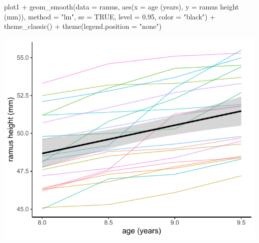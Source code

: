 \documentclass[
  9pt,
  ignorenonframetext,
]{beamer}
\newenvironment{Shaded}{\begin{snugshade}}{\end{snugshade}}
\newcommand{\AttributeTok}[1]{\textcolor[rgb]{0.77,0.63,0.00}{#1}}
\newcommand{\ConstantTok}[1]{\textcolor[rgb]{0.00,0.00,0.00}{#1}}
\newcommand{\FloatTok}[1]{\textcolor[rgb]{0.00,0.00,0.81}{#1}}
\newcommand{\FunctionTok}[1]{\textcolor[rgb]{0.00,0.00,0.00}{#1}}
\newcommand{\NormalTok}[1]{#1}
\newcommand{\SpecialCharTok}[1]{\textcolor[rgb]{0.00,0.00,0.00}{#1}}
\newcommand{\StringTok}[1]{\textcolor[rgb]{0.31,0.60,0.02}{#1}}
\begin{document}
\begin{frame}[fragile]{}
\protect\hypertarget{section-2}{}
\tiny

\begin{Shaded}
\begin{Highlighting}[]
\NormalTok{plot1 }\SpecialCharTok{+}  \FunctionTok{geom\_smooth}\NormalTok{(}\AttributeTok{data =}\NormalTok{ ramus, }
                     \FunctionTok{aes}\NormalTok{(}\AttributeTok{x =} \StringTok{\textasciigrave{}}\AttributeTok{age (years)}\StringTok{\textasciigrave{}}\NormalTok{,}
                         \AttributeTok{y =} \StringTok{\textasciigrave{}}\AttributeTok{ramus height (mm)}\StringTok{\textasciigrave{}}\NormalTok{),}
                     \AttributeTok{method =} \StringTok{"lm"}\NormalTok{, }\AttributeTok{se =} \ConstantTok{TRUE}\NormalTok{, }
                     \AttributeTok{level =} \FloatTok{0.95}\NormalTok{, }\AttributeTok{color =} \StringTok{"black"}\NormalTok{) }\SpecialCharTok{+}
  \FunctionTok{theme\_classic}\NormalTok{() }\SpecialCharTok{+}
  \FunctionTok{theme}\NormalTok{(}\AttributeTok{legend.position =} \StringTok{"none"}\NormalTok{)}
\end{Highlighting}
\end{Shaded}

\begin{center}\includegraphics[width=0.6\linewidth]{figs_L2/unnamed-chunk-5-1} \end{center}

\tiny
\end{frame}
\end{document}
